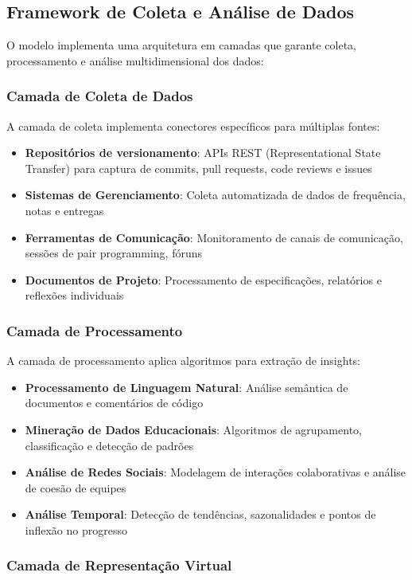 \documentclass[english, spanish, brazilian]{modelo_dt}
\begin{document}
\subsection{Framework de Coleta e Análise de Dados}

O modelo implementa uma arquitetura em camadas que garante coleta, processamento e análise multidimensional dos dados:

\subsubsection{Camada de Coleta de Dados}

A camada de coleta implementa conectores específicos para múltiplas fontes:
\begin{itemize}
\item \textbf{Repositórios de versionamento}: APIs REST (Representational State Transfer) para captura de commits, pull requests, code reviews e issues
\item \textbf{Sistemas de Gerenciamento}: Coleta automatizada de dados de frequência, notas e entregas
\item \textbf{Ferramentas de Comunicação}: Monitoramento de canais de comunicação, sessões de pair programming, fóruns
\item \textbf{Documentos de Projeto}: Processamento de especificações, relatórios e reflexões individuais
\end{itemize}

\subsubsection{Camada de Processamento}

A camada de processamento aplica algoritmos para extração de insights:
\begin{itemize}
\item \textbf{Processamento de Linguagem Natural}: Análise semântica de documentos e comentários de código
\item \textbf{Mineração de Dados Educacionais}: Algoritmos de agrupamento, classificação e detecção de padrões
\item \textbf{Análise de Redes Sociais}: Modelagem de interações colaborativas e análise de coesão de equipes
\item \textbf{Análise Temporal}: Detecção de tendências, sazonalidades e pontos de inflexão no progresso
\end{itemize}

\subsubsection{Camada de Representação Virtual}
\end{document}

